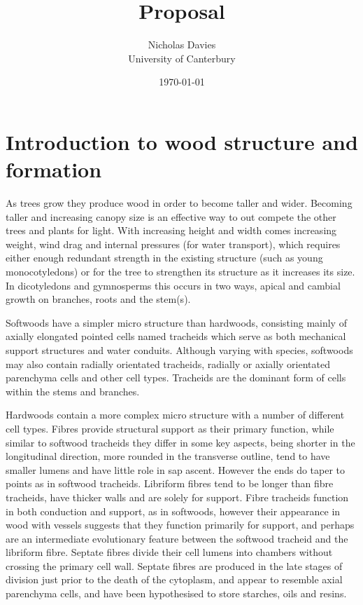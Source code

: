 \documentclass{article}
\begin{document}
\title{Proposal}

\author{Nicholas Davies\\ University of Canterbury }

\date{\today}



\maketitle

\section{Introduction to wood structure and formation}
As trees grow they produce wood in order to become taller and wider. Becoming
taller and increasing canopy size is an effective way to out compete the other
trees and plants for light. With increasing height and width comes increasing
weight, wind drag and internal pressures (for water transport), which requires
either enough redundant strength in the existing structure (such as young monocotyledons) or
for the tree to strengthen its structure as it increases its size. In
dicotyledons and gymnosperms this occurs in two ways, apical and cambial growth
on branches, roots and the stem(s).

Softwoods have a simpler micro structure than hardwoods, consisting mainly of
axially elongated pointed cells named tracheids which serve as both mechanical
support structures and water conduits. Although varying with species, softwoods
may also contain radially orientated tracheids, radially or axially orientated
parenchyma cells and other cell types. Tracheids are the dominant form of cells
within the stems and branches.

Hardwoods contain a more complex micro structure with a number
of different cell types. Fibres provide structural support as their primary
function, while similar to softwood tracheids they differ in some key aspects,
being shorter in the longitudinal direction, more rounded in the transverse
outline, tend to have smaller lumens and have little role in sap ascent.
However the ends do taper to points as in softwood tracheids. Libriform fibres tend to
be longer than fibre tracheids, have thicker walls and are solely for support.
Fibre tracheids function in both conduction and support, as in softwoods,
however their appearance in wood with vessels suggests that they function
primarily for support, and perhaps are an intermediate evolutionary feature
between the softwood tracheid and the libriform fibre. Septate fibres divide
their cell lumens into chambers without crossing the primary cell wall. Septate
fibres are produced in the late stages of division just prior to the death of
the cytoplasm, and appear to resemble axial parenchyma cells, and have been
hypothesised to store starches, oils and resins.
\end{document}
